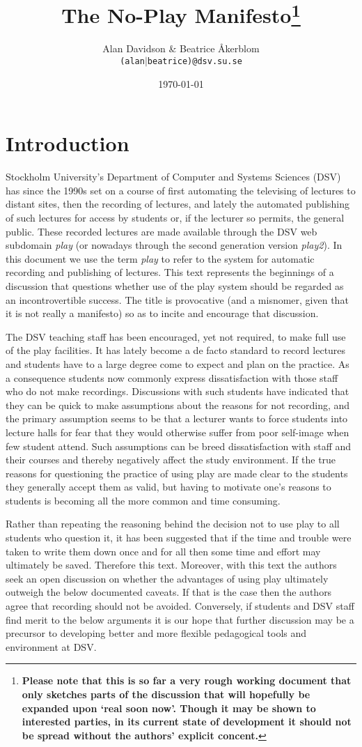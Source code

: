 \documentclass[a4paper,10pt]{article}
\title{The No-Play Manifesto\footnote{\textbf{Please note that this is so far a very rough working document that only sketches parts of the discussion that will hopefully be expanded upon `real soon now'. Though it may be shown to interested parties, in its current state of development it should not be spread without the authors' explicit concent. }}}
\author{Alan Davidson \& Beatrice Åkerblom\\ 
  \texttt{(alan$|$beatrice)@dsv.su.se}}
\date{\today}
\begin{document}
\maketitle
\tableofcontents

\section{Introduction}


Stockholm University's Department of Computer and Systems Sciences (DSV) has since the 1990s set on a course of first automating the televising of lectures to distant sites, then the recording of lectures, and lately the automated publishing of such lectures for access by students or, if the lecturer so permits, the general public. These recorded lectures are made available through the DSV web subdomain \emph{play} (or nowadays through the second generation version \emph{play2}). In this document we use the term \emph{play} to refer to the system for automatic recording and publishing of lectures. This text represents the beginnings of a discussion that questions whether use of the play system should be regarded as an incontrovertible success.  The title is provocative (and a misnomer, given that it is not really a manifesto) so as to incite and encourage that discussion. 

The DSV teaching staff has been encouraged, yet not required, to make full use of the play facilities. It has lately become a de facto standard to record lectures and students have to a large degree come to expect and plan on the practice. As a consequence students now commonly express dissatisfaction with those staff who do not make recordings. Discussions with such students have indicated that they can be quick to make assumptions about the reasons for not recording, and the primary assumption seems to be that a lecturer wants to force students into lecture halls for fear that they would otherwise suffer from poor self-image when few student attend. Such assumptions can be breed dissatisfaction with staff and their courses and thereby negatively affect the study environment. If the true reasons for questioning the practice of using play are made clear to the students they generally accept them as valid, but having to motivate one's reasons to students is becoming all the more common and time consuming.

Rather than repeating the reasoning behind the decision not to use play to all students who question it, it has been suggested that if the time and trouble were taken to write them down once and for all then some time and effort may ultimately be saved. Therefore this text. Moreover, with this text the authors seek an open discussion on whether the advantages of using play ultimately outweigh the below documented caveats. If that is the case then the authors agree that recording should not be avoided. Conversely, if students and DSV staff find merit to the below arguments it is our hope that further discussion may be a precursor to developing better and more flexible pedagogical tools and environment at DSV.
\end{document}
